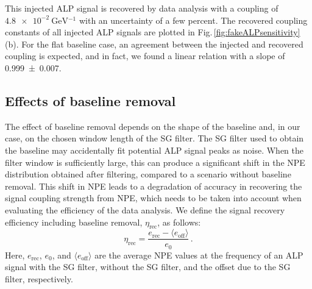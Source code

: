 This injected ALP signal is recovered by data analysis with a coupling of $\SI{4.8e-2}{\GeV^{-1}}$ with an uncertainty of a few percent.
The recovered coupling constants of all injected ALP signals are plotted in Fig.\,\ref{fig:fakeALPsensitivity}\,(b).
For the flat baseline case, an agreement between the injected and recovered coupling is expected, and in fact, we found a linear relation with a slope of \SI{0.999\pm0.007}{}.


\subsection{Effects of baseline removal}
\label{effectsofbase}

The effect of baseline removal depends on the shape of the baseline and, in our case, on the chosen window length of the SG filter.
The SG filter used to obtain the baseline may accidentally fit potential ALP signal peaks as noise.
When the filter window is sufficiently large, this can produce a significant shift in the NPE distribution obtained after filtering, compared to a scenario without baseline removal. 
This shift in NPE leads to a degradation of accuracy in recovering the signal coupling strength from NPE, which needs to be taken into account when evaluating the efficiency of the data analysis.
We define the signal recovery efficiency including baseline removal, $\eta_{\mathrm{rec}}$, as follows:
\begin{equation}
    \eta_{\mathrm{rec}} = \frac{e_{\mathrm{rec}} - \langle e_{\mathrm{off}} \rangle}{e_{0}}\,.
\end{equation}
Here, $e_{\mathrm{rec}}$, $e_{0}$, and $\langle e_{\mathrm{off}} \rangle$ are the average NPE values at the frequency of an ALP signal with the SG filter, without the SG filter, and the offset due to the SG filter, respectively.

